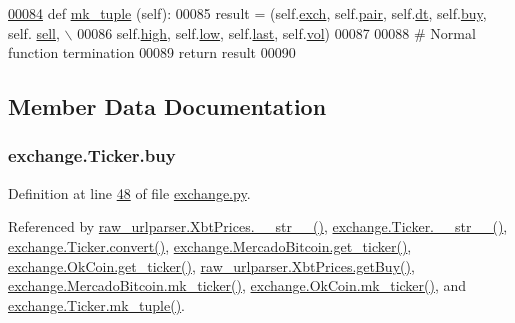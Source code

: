 \begin{DoxyCode}
\hypertarget{classexchange_1_1_ticker.tex_l00084}{}\hyperlink{classexchange_1_1_ticker_aba1398da3113a7ff17b2496ce92c7238}{00084}     \textcolor{keyword}{def }\hyperlink{classexchange_1_1_ticker_aba1398da3113a7ff17b2496ce92c7238}{mk\_tuple} (self): 
00085         result = (self.\hyperlink{classexchange_1_1_ticker_a33f33fe9a12da3ce52938afdc577c061}{exch}, self.\hyperlink{classexchange_1_1_ticker_a382f9199d13a7b5929a26065fad4e491}{pair}, self.\hyperlink{classexchange_1_1_ticker_a45e3162d9956cee797f21d93c44c6baf}{dt}, self.\hyperlink{classexchange_1_1_ticker_a2ca48c3fa9aba92241392a05bef39324}{buy}, self.
      \hyperlink{classexchange_1_1_ticker_a5ba9e257d2ed28f02528a37d9ebd793e}{sell}, \(\backslash\)
00086             self.\hyperlink{classexchange_1_1_ticker_aace381ca15468df6a40e8d86b7710a7f}{high}, self.\hyperlink{classexchange_1_1_ticker_a1c1f26a47a82fc799fcebf158e104405}{low}, self.\hyperlink{classexchange_1_1_ticker_add7c2d95fa790dcdffddae2e584ce5f5}{last}, self.\hyperlink{classexchange_1_1_ticker_a24c0dd396aebc54c06e429a68c964ea3}{vol})
00087             
00088         \textcolor{comment}{# Normal function termination }
00089         \textcolor{keywordflow}{return} result
00090         
\end{DoxyCode}


\subsection{Member Data Documentation}
\subsubsection[{\texorpdfstring{buy}{buy}}]{\setlength{\rightskip}{0pt plus 5cm}exchange.\+Ticker.\+buy}\hypertarget{classexchange_1_1_ticker_a2ca48c3fa9aba92241392a05bef39324}{}\label{classexchange_1_1_ticker_a2ca48c3fa9aba92241392a05bef39324}


Definition at line \hyperlink{exchange_8py_source_l00048}{48} of file \hyperlink{exchange_8py_source}{exchange.\+py}.



Referenced by \hyperlink{raw__urlparser_8py_source_l00074}{raw\+\_\+urlparser.\+Xbt\+Prices.\+\_\+\+\_\+str\+\_\+\+\_\+()}, \hyperlink{exchange_8py_source_l00099}{exchange.\+Ticker.\+\_\+\+\_\+str\+\_\+\+\_\+()}, \hyperlink{exchange_8py_source_l00055}{exchange.\+Ticker.\+convert()}, \hyperlink{exchange_8py_source_l00306}{exchange.\+Mercado\+Bitcoin.\+get\+\_\+ticker()}, \hyperlink{exchange_8py_source_l00371}{exchange.\+Ok\+Coin.\+get\+\_\+ticker()}, \hyperlink{raw__urlparser_8py_source_l00062}{raw\+\_\+urlparser.\+Xbt\+Prices.\+get\+Buy()}, \hyperlink{exchange_8py_source_l00320}{exchange.\+Mercado\+Bitcoin.\+mk\+\_\+ticker()}, \hyperlink{exchange_8py_source_l00385}{exchange.\+Ok\+Coin.\+mk\+\_\+ticker()}, and \hyperlink{exchange_8py_source_l00084}{exchange.\+Ticker.\+mk\+\_\+tuple()}.

